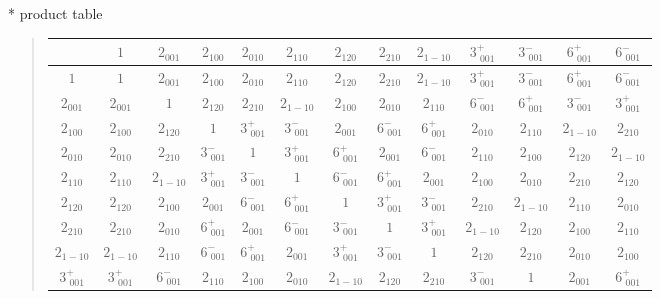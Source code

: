 \documentclass[fleqn,10pt,landscape]{jsarticle}
\begin{document}
* product table
\begin{quote}
\begin{tabular}{ccccccccccccc} \hline \hline
 & $ 1 $ & $ 2{}_{001} $ & $ 2{}_{100} $ & $ 2{}_{010} $ & $ 2{}_{110} $ & $ 2{}_{120} $ & $ 2{}_{210} $ & $ 2{}_{1-10} $ & $ 3^{+}_{\,\,001} $ & $ 3^{-}_{\,\,001} $ & $ 6^{+}_{\,\,001} $ & $ 6^{-}_{\,\,001} $ \\ \hline
$ 1 $ & $ 1 $ & $ 2{}_{001} $ & $ 2{}_{100} $ & $ 2{}_{010} $ & $ 2{}_{110} $ & $ 2{}_{120} $ & $ 2{}_{210} $ & $ 2{}_{1-10} $ & $ 3^{+}_{\,\,001} $ & $ 3^{-}_{\,\,001} $ & $ 6^{+}_{\,\,001} $ & $ 6^{-}_{\,\,001} $ \\
$ 2{}_{001} $ & $ 2{}_{001} $ & $ 1 $ & $ 2{}_{120} $ & $ 2{}_{210} $ & $ 2{}_{1-10} $ & $ 2{}_{100} $ & $ 2{}_{010} $ & $ 2{}_{110} $ & $ 6^{-}_{\,\,001} $ & $ 6^{+}_{\,\,001} $ & $ 3^{-}_{\,\,001} $ & $ 3^{+}_{\,\,001} $ \\
$ 2{}_{100} $ & $ 2{}_{100} $ & $ 2{}_{120} $ & $ 1 $ & $ 3^{+}_{\,\,001} $ & $ 3^{-}_{\,\,001} $ & $ 2{}_{001} $ & $ 6^{-}_{\,\,001} $ & $ 6^{+}_{\,\,001} $ & $ 2{}_{010} $ & $ 2{}_{110} $ & $ 2{}_{1-10} $ & $ 2{}_{210} $ \\
$ 2{}_{010} $ & $ 2{}_{010} $ & $ 2{}_{210} $ & $ 3^{-}_{\,\,001} $ & $ 1 $ & $ 3^{+}_{\,\,001} $ & $ 6^{+}_{\,\,001} $ & $ 2{}_{001} $ & $ 6^{-}_{\,\,001} $ & $ 2{}_{110} $ & $ 2{}_{100} $ & $ 2{}_{120} $ & $ 2{}_{1-10} $ \\
$ 2{}_{110} $ & $ 2{}_{110} $ & $ 2{}_{1-10} $ & $ 3^{+}_{\,\,001} $ & $ 3^{-}_{\,\,001} $ & $ 1 $ & $ 6^{-}_{\,\,001} $ & $ 6^{+}_{\,\,001} $ & $ 2{}_{001} $ & $ 2{}_{100} $ & $ 2{}_{010} $ & $ 2{}_{210} $ & $ 2{}_{120} $ \\
$ 2{}_{120} $ & $ 2{}_{120} $ & $ 2{}_{100} $ & $ 2{}_{001} $ & $ 6^{-}_{\,\,001} $ & $ 6^{+}_{\,\,001} $ & $ 1 $ & $ 3^{+}_{\,\,001} $ & $ 3^{-}_{\,\,001} $ & $ 2{}_{210} $ & $ 2{}_{1-10} $ & $ 2{}_{110} $ & $ 2{}_{010} $ \\
$ 2{}_{210} $ & $ 2{}_{210} $ & $ 2{}_{010} $ & $ 6^{+}_{\,\,001} $ & $ 2{}_{001} $ & $ 6^{-}_{\,\,001} $ & $ 3^{-}_{\,\,001} $ & $ 1 $ & $ 3^{+}_{\,\,001} $ & $ 2{}_{1-10} $ & $ 2{}_{120} $ & $ 2{}_{100} $ & $ 2{}_{110} $ \\
$ 2{}_{1-10} $ & $ 2{}_{1-10} $ & $ 2{}_{110} $ & $ 6^{-}_{\,\,001} $ & $ 6^{+}_{\,\,001} $ & $ 2{}_{001} $ & $ 3^{+}_{\,\,001} $ & $ 3^{-}_{\,\,001} $ & $ 1 $ & $ 2{}_{120} $ & $ 2{}_{210} $ & $ 2{}_{010} $ & $ 2{}_{100} $ \\
$ 3^{+}_{\,\,001} $ & $ 3^{+}_{\,\,001} $ & $ 6^{-}_{\,\,001} $ & $ 2{}_{110} $ & $ 2{}_{100} $ & $ 2{}_{010} $ & $ 2{}_{1-10} $ & $ 2{}_{120} $ & $ 2{}_{210} $ & $ 3^{-}_{\,\,001} $ & $ 1 $ & $ 2{}_{001} $ & $ 6^{+}_{\,\,001} $ \\

\end{tabular}
\end{quote}
\end{document}
